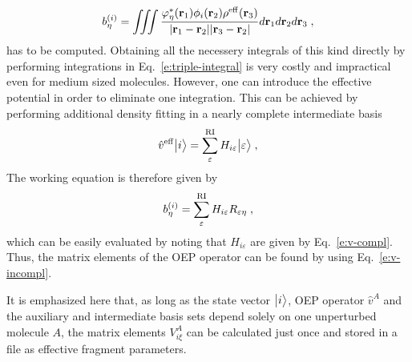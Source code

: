 %
\begin{equation} \label{e:triple-integral}
 b^{(i)}_\eta = \iiint 
           \frac{ \varphi^*_\eta({\bf r}_1) \phi_i({\bf r}_2)  \rho^{\rm eff}({\bf r}_3) }
            {\vert {\bf r}_1 - {\bf r}_2 \vert \vert {\bf r}_3 - {\bf r}_2 \vert}
           d{\bf r}_1 d{\bf r}_2 d{\bf r}_3 \;,
\end{equation}
%
has to be computed.
Obtaining all the necessery integrals of this kind directly 
by performing integrations in Eq.~\eqref{e:triple-integral} is very costly 
and impractical even for medium sized molecules. 
However, one can introduce the effective potential in order to eliminate one integration. 
This can be achieved by performing additional density fitting in a nearly complete intermediate basis 
%
\begin{equation}
 \hat{v}^{\rm eff} \Ket{i} = \sum_\varepsilon^{\rm RI} H_{i\varepsilon} \Ket{\varepsilon} \;,
\end{equation}
%
The working equation is therefore given by
%
\begin{equation} \label{e:v-compl-b-coeff}
 b^{(i)}_\eta = \sum_\varepsilon^{\rm RI} H_{i\varepsilon} R_{\varepsilon\eta} \;,
\end{equation}
%
which can be easily evaluated by noting that
$H_{i\varepsilon}$ are given by Eq.~\eqref{e:v-compl}.
Thus, the matrix elements of the OEP operator can be found
by using Eq.~\eqref{e:v-incompl}.

It is emphasized here that, as long as the state vector $\Ket{i}$, OEP operator $\hat{v}^A$ 
and the auxiliary and intermediate basis sets depend solely on one unperturbed molecule $A$, the matrix elements
$V^A_{i\xi}$ can be calculated just once and stored in a file as effective fragment parameters.




